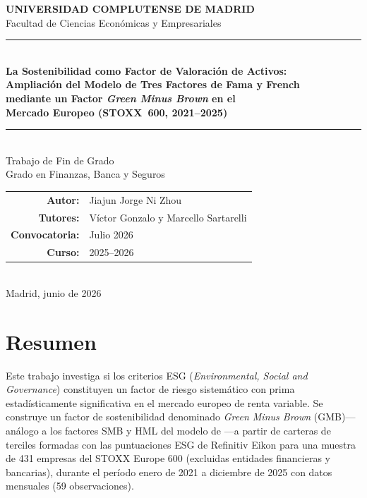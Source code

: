 \documentclass[12pt, a4paper]{article}
\begin{document}

\begin{titlepage}
  \centering
  \vspace*{1cm}
  {\large\textbf{UNIVERSIDAD COMPLUTENSE DE MADRID}\\[0.3em]
  Facultad de Ciencias Econ\'omicas y Empresariales}\\[1.5cm]

  \rule{\linewidth}{0.5mm}\\[0.5em]
  {\LARGE\bfseries La Sostenibilidad como Factor de Valoraci\'on de Activos:\\[0.3em]
  Ampliaci\'on del Modelo de Tres Factores de Fama y French\\[0.3em]
  mediante un Factor \textit{Green Minus Brown} en el\\[0.3em]
  Mercado Europeo (STOXX~600, 2021--2025)}\\[0.3em]
  \rule{\linewidth}{0.5mm}\\[1.5cm]

  {\large Trabajo de Fin de Grado\\[0.3em]
  Grado en Finanzas, Banca y Seguros}\\[1.5cm]

  \begin{tabular}{rl}
    \textbf{Autor:}        & Jiajun Jorge Ni Zhou \\[0.5em]
    \textbf{Tutores:}      & V\'ictor Gonzalo y Marcello Sartarelli \\[0.5em]
    \textbf{Convocatoria:} & Julio 2026 \\[0.5em]
    \textbf{Curso:}        & 2025--2026 \\
  \end{tabular}\\[2cm]

  \vfill
  {\large Madrid, junio de 2026}
\end{titlepage}

\newpage
\thispagestyle{plain}
\section*{Resumen}

\noindent
Este trabajo investiga si los criterios ESG (\textit{Environmental, Social and Governance})
constituyen un factor de riesgo sistem\'atico con prima estad\'isticamente significativa en el
mercado europeo de renta variable. Se construye un factor de sostenibilidad denominado
\textit{Green Minus Brown} (GMB)---an\'alogo a los factores SMB y HML del modelo de
\textcite{famafrench1993}---a partir de carteras de terciles formadas con las puntuaciones
ESG de Refinitiv Eikon para una muestra de 431 empresas del STOXX Europe 600
(excluidas entidades financieras y bancarias), durante el per\'iodo enero de 2021 a
diciembre de 2025 con datos mensuales (59 observaciones).
\end{document}
